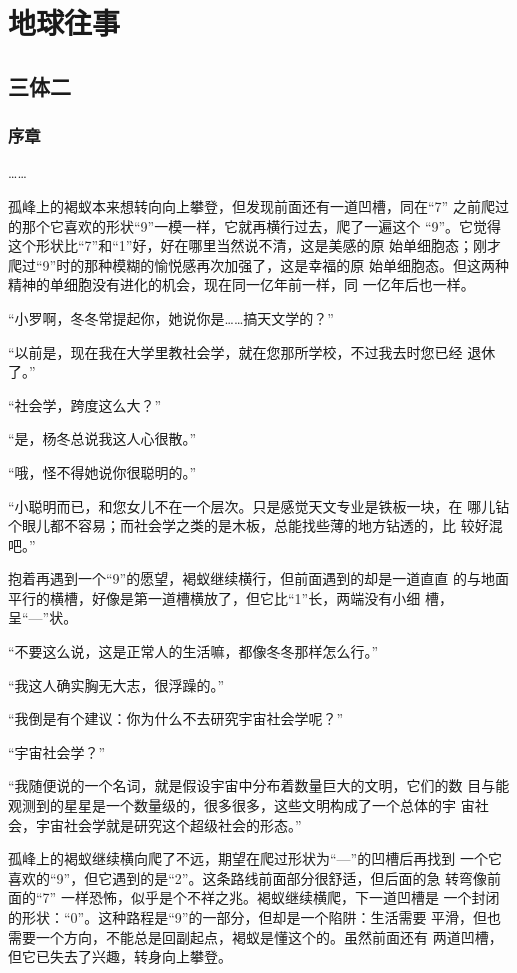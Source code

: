 \chapter{地球往事}

\section{三体二}

\subsection{序章}
……

孤峰上的褐蚁本来想转向向上攀登，但发现前面还有一道凹槽，同在“7”
之前爬过的那个它喜欢的形状“9”一模一样，它就再横行过去，爬了一遍这个
“9”。它觉得这个形状比“7”和“1”好，好在哪里当然说不清，这是美感的原
始单细胞态；刚才爬过“9”时的那种模糊的愉悦感再次加强了，这是幸福的原
始单细胞态。但这两种精神的单细胞没有进化的机会，现在同一亿年前一样，同
一亿年后也一样。

“小罗啊，冬冬常提起你，她说你是……搞天文学的？”

“以前是，现在我在大学里教社会学，就在您那所学校，不过我去时您已经
退休了。”

“社会学，跨度这么大？”

“是，杨冬总说我这人心很散。”

“哦，怪不得她说你很聪明的。”

“小聪明而已，和您女儿不在一个层次。只是感觉天文专业是铁板一块，在
哪儿钻个眼儿都不容易；而社会学之类的是木板，总能找些薄的地方钻透的，比
较好混吧。”

抱着再遇到一个“9”的愿望，褐蚁继续横行，但前面遇到的却是一道直直
的与地面平行的横槽，好像是第一道槽横放了，但它比“1”长，两端没有小细
槽，呈“---”状。

“不要这么说，这是正常人的生活嘛，都像冬冬那样怎么行。”

“我这人确实胸无大志，很浮躁的。”

“我倒是有个建议：你为什么不去研究宇宙社会学呢？”

“宇宙社会学？”

“我随便说的一个名词，就是假设宇宙中分布着数量巨大的文明，它们的数
目与能观测到的星星是一个数量级的，很多很多，这些文明构成了一个总体的宇
宙社会，宇宙社会学就是研究这个超级社会的形态。”

孤峰上的褐蚁继续横向爬了不远，期望在爬过形状为“---”的凹槽后再找到
一个它喜欢的“9”，但它遇到的是“2”。这条路线前面部分很舒适，但后面的急
转弯像前面的“7” 一样恐怖，似乎是个不祥之兆。褐蚁继续横爬，下一道凹槽是
一个封闭的形状：“0”。这种路程是“9”的一部分，但却是一个陷阱：生活需要
平滑，但也需要一个方向，不能总是回副起点，褐蚁是懂这个的。虽然前面还有
两道凹槽，但它已失去了兴趣，转身向上攀登。

